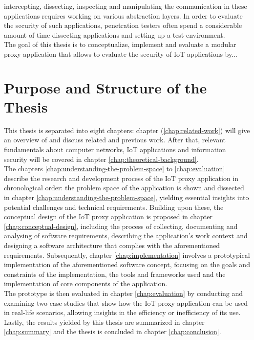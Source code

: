 intercepting, dissecting, inspecting and manipulating the communication in these applications requires working on various abstraction layers. In order to evaluate the security of such applications, penetration testers often spend a considerable amount of time dissecting applications and setting up a test-environment.\\
The goal of this thesis is to conceptualize, implement and evaluate a modular proxy application that allows to evaluate the security of \ac{IoT} applications by... %

\section{Purpose and Structure of the Thesis}
This thesis is separated into eight chapters: chapter (\ref{chap:related-work}) will give an overview of and discuss related and previous work. After that, relevant fundamentals about computer networks, \ac{IoT} applications and information security will be covered in chapter \ref{chap:theoretical-background}.\\
The chapters \ref{chap:understanding-the-problem-space} to \ref{chap:evaluation} describe the research and development process of the \ac{IoT} proxy application in chronological order: the problem space of the application is shown and dissected in chapter \ref{chap:understanding-the-problem-space}, yielding essential insights into potential challenges and technical requirements. Building upon these, the conceptual design of the \ac{IoT} proxy application is proposed in chapter \ref{chap:conceptual-design}, including the process of collecting, documenting and analysing of software requirements, describing the application's work context and designing a software architecture that complies with the aforementioned requirements. Subsequently, chapter \ref{chap:implementation} involves a prototypical implementation of the aforementioned software concept, focusing on the goals and constraints of the implementation, the tools and frameworks used and the implementation of core components of the application.\\
The prototype is then evaluated in chapter \ref{chap:evaluation} by conducting and examining two case studies that show how the \ac{IoT} proxy application can be used in real-life scenarios, allowing insights in the efficiency or inefficiency of its use. Lastly, the results yielded by this thesis are summarized in chapter \ref{chap:summary} and the thesis is concluded in chapter \ref{chap:conclusion}. 

